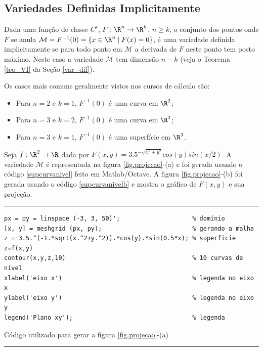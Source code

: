 \newpage
\newpage

\subsection{Variedades Definidas Implicitamente}\label{var_impl}

Dada uma fun\c{c}\~ao de classe $C^r$, $F : \R^n \rightarrow \R^k$, $n \geq k$,  o conjunto dos pontos onde $F$ se anula $\mathcal{M} = F^{-1}(0) = \{ x \in \R^n  \; | \: F(x) = 0 \}$, \'e uma variedade definida implicitamente se para todo ponto em $\mathcal{M}$ a derivada de $F$ neste ponto tem posto m\'aximo. Neste caso a variedade $\mathcal{M}$ tem dimens\~ao $n-k$ (veja o Teorema \ref{teo_VI} da Se\c{c}\~ao \ref{var_dif}). 

Os casos mais comuns geralmente vistos nos cursos de c\'alculo s\~ao:
\begin{itemize}
 \item Para $n=2$ e $k=1$, $F^{-1}(0)$ \'e uma curva em $\R^2$;
 \item Para $n=3$ e $k=2$, $F^{-1}(0)$ \'e uma curva em $\R^3$;
 \item Para $n=3$ e $k=1$, $F^{-1}(0)$ \'e uma superf\'icie em $\R^3$.
\end{itemize}


 Seja $f:\R^2 \rightarrow \R$ dada por  $F(x,y)=3.5^{-\sqrt{x^2+y^2}} cos(y) sin(x/2)$. A variedade $\mathcal{M}$ é representada na figura \ref{fig.projecao}-(a) e foi gerada usando o código \ref{supcurvanivel} feito em Matlab/Octave. A figura \ref{fig.projecao}-(b) foi gerada usando o código \ref{supcurvanivelb} e mostra o gráfico de $F(x,y)$ e sua projeção.

\begin{Codigo}[htpb]
\noindent\rule{13cm}{1.pt}
 \begin{verbatim}
px = py = linspace (-3, 3, 50)';                    % domínio
[x, y] = meshgrid (px, py);                         % gerando a malha
z = 3.5.^(-1.*sqrt(x.^2+y.^2)).*cos(y).*sin(0.5*x); % superficie z=f(x,y)
contour(x,y,z,10)                                   % 10 curvas de nível
xlabel('eixo x')                                    % legenda no eixo x
ylabel('eixo y')                                    % legenda no eixo y
legend('Plano xy');                                 % legenda
\end{verbatim} 
\caption{Código utilizado para gerar a figura \ref{fig.projecao}-(a) } 
\noindent\rule{13cm}{1.pt}
\label{supcurvanivel}
\end{Codigo}

